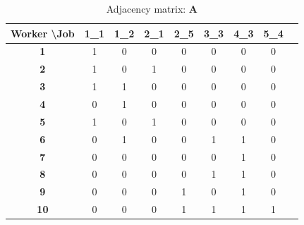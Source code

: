 \documentclass[12pt]{article}
\theoremstyle{definition}
\theoremstyle{plain}
\begin{document}
\begin{figure}
\begin{minipage}{.5\textwidth}
	\end{minipage}%
	\label{fig:network_representation}
\end{figure}

\begin{table}[h!]
	\centering
	\caption{Adjacency matrix: $\mathbf{A}$}
	\begin{tabular}{c|cccccccc} %
		\toprule
		\textbf{Worker \textbackslash Job} & \textbf{1\_1} & \textbf{1\_2} & \textbf{2\_1} & \textbf{2\_5} & \textbf{3\_3} & \textbf{4\_3} & \textbf{5\_4}  \\
		\midrule
		\textbf{1}                         & 1             & 0             & 0             & 0             & 0             & 0             & 0   \\
		\textbf{2}                         & 1             & 0             & 1             & 0             & 0             & 0             & 0   \\
		\textbf{3}                         & 1             & 1             & 0             & 0             & 0             & 0             & 0   \\
		\textbf{4}                         & 0             & 1             & 0             & 0             & 0             & 0             & 0   \\
		\textbf{5}                         & 1             & 0             & 1             & 0             & 0             & 0             & 0   \\
		\textbf{6}                         & 0             & 1             & 0             & 0             & 1             & 1             & 0   \\
		\textbf{7}                         & 0             & 0             & 0             & 0             & 0             & 1             & 0   \\
		\textbf{8}                         & 0             & 0             & 0             & 0             & 1             & 1             & 0   \\
		\textbf{9}                         & 0             & 0             & 0             & 1             & 0             & 1             & 0   \\
		\textbf{10}                        & 0             & 0             & 0             & 1             & 1             & 1             & 1   \\
	\bottomrule
	\end{tabular}
	\label{table:adjacency_appendix}
\end{table}
\end{document}
